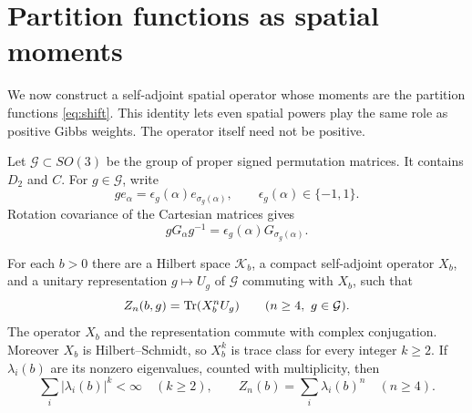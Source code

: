 \section{Partition functions as spatial moments}\label{sec:transfer}

We now construct a self-adjoint spatial operator whose moments are the
partition functions \eqref{eq:shift}. This identity lets even spatial
powers play the same role as positive Gibbs weights. The operator itself
need not be positive.

Let $\mathcal G\subset SO(3)$ be the group of proper signed permutation
matrices. It contains $D_2$ and $C$. For $g\in\mathcal G$, write
\[
 g e_\alpha=\epsilon_g(\alpha)e_{\sigma_g(\alpha)},
 \qquad \epsilon_g(\alpha)\in\{-1,1\}.
\]
Rotation covariance of the Cartesian matrices gives
\begin{equation}\label{eq:rotation-covariance}
 gG_\alpha g^{-1}
   =\epsilon_g(\alpha)G_{\sigma_g(\alpha)}.
\end{equation}

\begin{proposition}\label{prop:transfer}
For each $b>0$ there are a Hilbert space $\mathcal K_b$, a compact
self-adjoint operator $X_b$, and a unitary representation
$g\mapsto U_g$ of $\mathcal G$ commuting with $X_b$, such that
\begin{equation}\label{eq:spatial-trace}
 Z_n(b,g)=\operatorname{Tr}(X_b^nU_g)
 \qquad(n\ge4,\ g\in\mathcal G).
\end{equation}
The operator $X_b$ and the representation commute with complex
conjugation. Moreover $X_b$ is Hilbert--Schmidt, so $X_b^k$ is trace class
for every integer $k\ge2$. If $\lambda_i(b)$ are its nonzero eigenvalues,
counted with multiplicity, then
\begin{equation}\label{eq:spatial-moments}
 \sum_i|\lambda_i(b)|^k<\infty\quad(k\ge2),\qquad
 Z_n(b)=\sum_i\lambda_i(b)^n\quad(n\ge4).
\end{equation}
\end{proposition}

